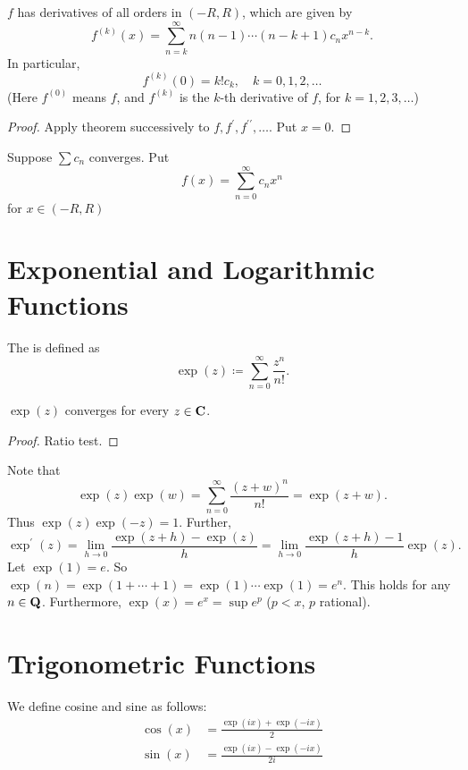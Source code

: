 \begin{corollary}
$f$ has derivatives of all orders in $(-R,R)$, which are given by
\[f^{(k)}(x)=\sum_{n=k}^\infty n(n-1)\cdots(n-k+1)c_nx^{n-k}.\]
In particular,
\[f^{(k)}(0)=k!c_k,\quad k=0,1,2,\dots\]
(Here $f^{(0)}$ means $f$, and $f^{(k)}$ is the $k$-th derivative of $f$, for $k=1,2,3,\dots$)
\end{corollary}

\begin{proof}
Apply theorem successively to $f,f^\prime,f^{\prime\prime},\dots$. Put $x=0$.
\end{proof}

\begin{proposition}
Suppose $\sum c_n$ converges. Put
\[f(x)=\sum_{n=0}^\infty c_n x^n\]
for $x\in(-R,R)$
\end{proposition}

\section{Exponential and Logarithmic Functions}
\begin{definition}
The  is defined as
\begin{equation}
\exp(z)\coloneqq\sum_{n=0}^\infty\frac{z^n}{n!}.
\end{equation}
\end{definition}

\begin{proposition}
$\exp(z)$ converges for every $z\in\mathbf C$.
\end{proposition}

\begin{proof}
Ratio test.
\end{proof}

Note that
\[\exp(z)\exp(w)=\sum_{n=0}^{\infty}\frac{(z+w)^n}{n!}=\exp(z+w).\]
Thus $\exp(z)\exp(-z)=1$. Further,
\[\exp^\prime(z)=\lim_{h\to0}\frac{\exp(z+h)-\exp(z)}{h}=\lim_{h\to0}\frac{\exp(z+h)-1}{h}\exp(z).\]
Let $\exp(1)=e$. So $\exp(n)=\exp(1+\cdots+1)=\exp(1)\cdots\exp(1)=e^n$. This holds for any $n\in\mathbf Q$. Furthermore, $\exp(x)=e^x=\sup e^p$ ($p<x$, $p$ rational).

\section{Trigonometric Functions}
\begin{definition}
We define cosine and sine as follows:
\begin{equation}
\begin{split}
\cos(x)&=\frac{\exp(ix)+\exp(-ix)}{2}\\
\sin(x)&=\frac{\exp(ix)-\exp(-ix)}{2i}
\end{split}
\end{equation}
\end{definition}

